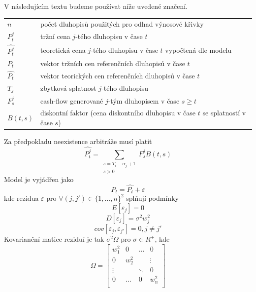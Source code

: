 \documentclass[a4paper]{book}
\begin{document}
V následujícím textu budeme používat níže uvedené značení.
\begin{center}
\begin{tabular}{l l}
$n$ & počet dluhopisů použitých pro odhad výnosové křivky \\
$P_t^j$ & tržní cena $j$-tého dluhopisu v čase $t$ \\
$\hat{P_t^j}$ & teoretická cena $j$-tého dluhopisu v čase $t$ vypočtená dle modelu \\
$P_t$ & vektor tržních cen referenčních dluhopisů v čase $t$ \\
$\hat{P_t}$ & vektor teorických cen referenčních dluhopisů v čase $t$ \\
$T_j$ & zbytková splatnost $j$-tého dluhopisu \\
$F_s^j$ & cash-flow generované $j$-tým dluhopisem v čase $s \ge t$ \\
$B(t,s)$ & diskontní faktor (cena diskontního dluhopisu v čase $t$ se splatností v čase $s$) \\ 
\end{tabular}
\end{center}
Za předpokladu neexistence arbitráže musí platit
\begin{equation*}
\hat{P_t^j} = \sum_{\substack{s = T_i - \alpha_j + 1 \\ s > 0}} F_s^j B(t,s)
\end{equation*}
Model je vyjádřen jako
\begin{equation*}
P_t = \hat{P_t} + \varepsilon
\end{equation*}
kde rezidua $\varepsilon$ pro $\forall(j, j') \in \{1, ..., n\}^2$ splňují podmínky
\begin{equation*}
E[\varepsilon_j] = 0
\end{equation*}
\begin{equation*}
D[\varepsilon_j] = \sigma^2 w_j^2
\end{equation*}
\begin{equation*}
cov[\varepsilon_j, \varepsilon_{j'}] = 0, j \neq j'
\end{equation*}
Kovarianční matice reziduí je tak $\sigma^2 \Omega$ pro $\sigma \in R^+$, kde
\begin{equation*}
\Omega =
\begin{bmatrix}
w_1^2 & 0 & \dots & 0 \\
0 & w_2^2 & & \vdots \\
\vdots & & \ddots & 0 \\
0 & \dots & 0 & w_n^2 \\
\end{bmatrix}
\end{equation*}
\end{document}
